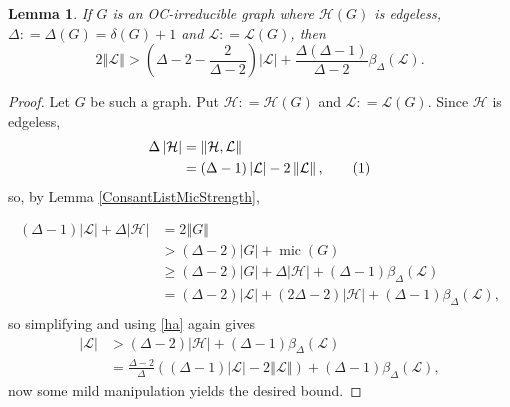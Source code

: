 \documentclass[12pt]{article}
\theoremstyle{plain}
\newtheorem{lem}[thm]{Lemma}
\theoremstyle{definition}
\theoremstyle{remark}
\newcommand{\fancy}[1]{\mathcal{#1}}
\renewcommand{\L}{\fancy{L}}
\newcommand{\HH}{\fancy{H}}
\newcommand{\card}[1]{\left|#1\right|}
\newcommand{\size}[1]{\left\Vert#1\right\Vert}
\newcommand{\parens}[1]{\left( #1 \right)}
\newcommand{\DefinedAs}{\mathrel{\mathop:}=}
\newcommand{\mic}{\operatorname{mic}}
\newcommand\numberthis{\addtocounter{equation}{1}\tag{\theequation}}
\begin{document}
\begin{lem}\label{LBound}
If $G$ is an OC-irreducible graph where $\HH(G)$ is edgeless, $\Delta \DefinedAs \Delta(G) = \delta(G) + 1$ and $\L\DefinedAs\L(G)$, then
\[2\size{\L} > \parens{\Delta-2 - \frac{2}{\Delta-2}}\card{\L} + \frac{\Delta(\Delta-1)}{\Delta-2}\beta_{\Delta}(\L).\]
\end{lem}
\begin{proof}
Let $G$ be such a graph. Put $\HH \DefinedAs \HH(G)$ and $\L \DefinedAs \L(G)$.  Since
$\HH$ is edgeless,
\begin{align*}
\Delta\card{\HH}&= \size{\HH, \L}\\
&=(\Delta-1)\card{\L} - 2\size{\L},\numberthis \label{ha}\\
\end{align*}
so, by Lemma \ref{ConsantListMicStrength},

\begin{align*}
(\Delta-1)\card{\L} + \Delta\card{\HH} &= 2\size{G}\\
&> (\Delta-2)\card{G} + \mic(G) \\
&\ge (\Delta-2)\card{G} + \Delta\card{\HH} + (\Delta-1)\beta_{\Delta}(\L)\\
&= (\Delta-2)\card{\L} + (2\Delta-2)\card{\HH} + (\Delta-1)\beta_{\Delta}(\L),\\
\end{align*}
so simplifying and using \eqref{ha} again gives
\begin{align*}
\card{\L} &> (\Delta-2)\card{\HH} + (\Delta-1)\beta_{\Delta}(\L)\\
&= \frac{\Delta-2}{\Delta}\parens{(\Delta-1)\card{\L} - 2\size{\L}} + (\Delta-1)\beta_{\Delta}(\L),
\end{align*}
now some mild manipulation yields the desired bound. 
\end{proof}
\end{document}

